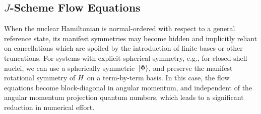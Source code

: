 \subsection{\texorpdfstring{$J$}{J}-Scheme Flow Equations\label{sec:flow_jscheme}}
When the nuclear Hamiltonian is normal-ordered with respect to a general reference state, its manifest symmetries may become hidden and implicitly reliant on cancellations which are spoiled by the introduction of finite bases or other truncations. For systems with explicit spherical symmetry, e.g., for closed-shell nuclei, we can use a spherically symmetric $\,|{\Phi}\rangle$, and preserve the manifest rotational symmetry of $H$ on a term-by-term basis. In this case, the flow equations become block-diagonal in angular momentum, and independent of the angular momentum projection quantum numbers, which leads to a significant reduction in numerical effort.


